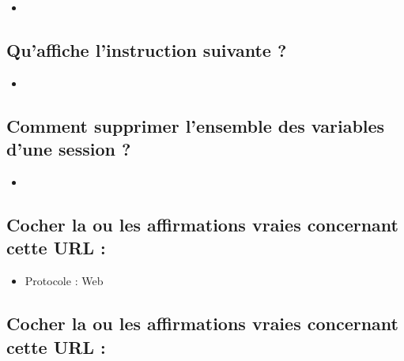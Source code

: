 \documentclass[11pt,a4paper]{article}
\begin{document}
\begin{itemize}
\item[\CaseCoche]  \\
\end{itemize}


\subsection{Qu'affiche l'instruction suivante ?}


\bigskip

\begin{itemize}
\item[\CaseCoche]  \\
\end{itemize}


\subsection{Comment supprimer l'ensemble des variables d'une session ?}

\begin{itemize}
\item[\CaseCoche]  \\
\end{itemize}


\subsection{Cocher la ou les affirmations vraies concernant cette URL :}


\bigskip

\begin{itemize}
\item[\CaseCoche] Protocole : Web \\
\end{itemize}


\subsection{Cocher la ou les affirmations vraies concernant cette URL :}

\end{document}

